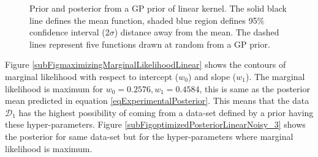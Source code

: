 \begin{figure}[!ht]
  \centering
    \quad
{}\quad

       \caption{Prior and posterior from a GP prior of linear kernel. The solid black line defines the mean function, shaded blue region defines 95\% confidence interval (2$\sigma$) distance away from the mean. The dashed lines represent five functions drawn at random from a GP prior.}
       \label{figPriorAndPosteriorLinearKernel}
\end{figure}

\begin{mdframed}[hidealllines=true,backgroundcolor=lightgray!20]
Figure \ref{subFigmaximizingMarginalLikelihoodLinear} shows the contours of marginal likelihood with respect to intercept ($w_{0}$) and slope ($w_{1}$). The marginal likelihood is maximum for $w_{0} = 0.2576, w_{1} = 0.4584$, this is same as the posterior mean predicted in equation \ref{eqExperimentalPosterior}. This means that the data $\mathcal{D}_{1}$ has the highest possibility of coming from a data-set defined by a prior having these hyper-parameters. Figure \ref{subFigoptimizedPosteriorLinearNoisy_3} shows the posterior for same data-set but for the hyper-parameters where marginal likelihood is maximum.
\end{mdframed}


